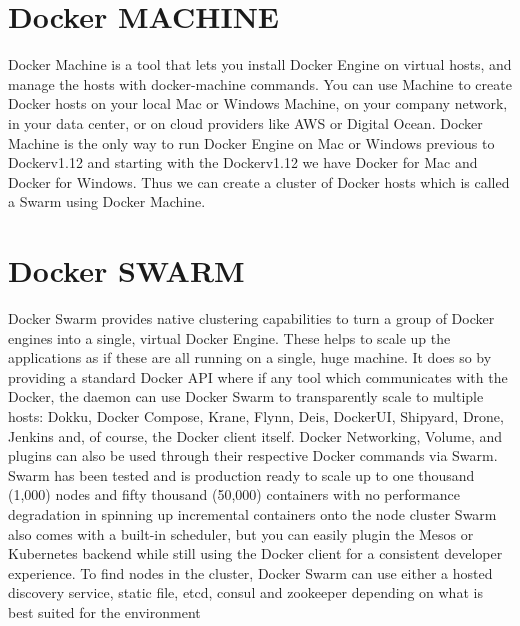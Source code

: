 \documentclass[9pt,twocolumn,twoside]{../../styles/osajnl}
\begin{document}
\section{Docker MACHINE}

Docker Machine is a tool that lets you install Docker Engine on
virtual hosts, and manage the hosts with docker-machine
commands\cite{www-docker-machine}. You can use Machine to create
Docker hosts on your local Mac or Windows Machine, on your company
network, in your data center, or on cloud providers like AWS or
Digital Ocean. Docker Machine is the only way to run Docker Engine on
Mac or Windows previous to Dockerv1.12 and starting with the
Dockerv1.12 we have Docker for Mac and Docker for Windows. Thus we can
create a cluster of Docker hosts which is called a Swarm using Docker
Machine.

\section{Docker SWARM}
Docker Swarm provides native clustering capabilities to turn a group
of Docker engines into a single, virtual Docker
Engine\cite{www-docker-swarm}. These helps to scale up the
applications as if these are all running on a single, huge machine. It
does so by providing a standard Docker API where if any tool which
communicates with the Docker, the daemon can use Docker Swarm to
transparently scale to multiple hosts: Dokku, Docker Compose, Krane,
Flynn, Deis, DockerUI, Shipyard, Drone, Jenkins and, of course, the
Docker client itself.  Docker Networking, Volume, and plugins can also
be used through their respective Docker commands via Swarm. Swarm has
been tested and is production ready to scale up to one thousand
(1,000) nodes and fifty thousand (50,000) containers with no
performance degradation in spinning up incremental containers onto the
node cluster Swarm also comes with a built-in scheduler, but you can
easily plugin the Mesos or Kubernetes backend while still using the
Docker client for a consistent developer experience. To find nodes in
the cluster, Docker Swarm can use either a hosted discovery service,
static file, etcd, consul and zookeeper depending on what is best
suited for the environment\cite{www-docker-machine}
\end{document}
